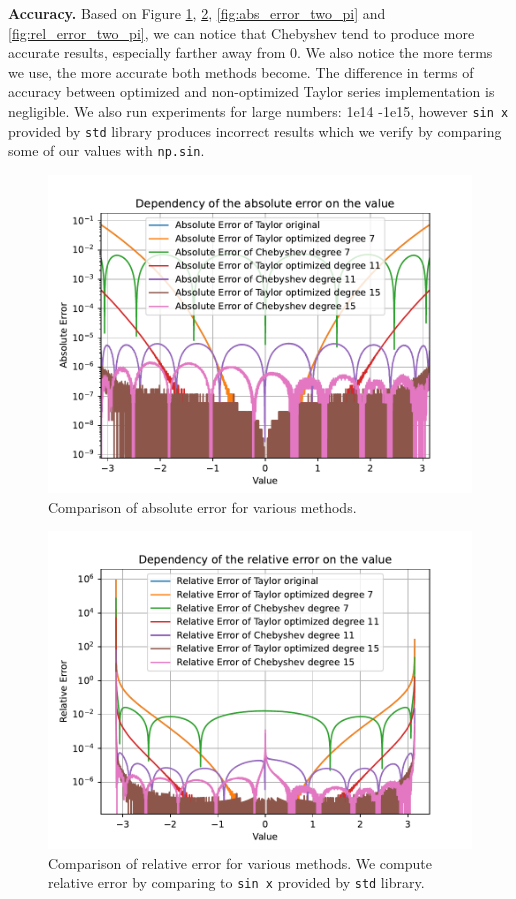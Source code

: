 \documentclass[12pt]{article}
\begin{document}
\textbf{Accuracy.}
Based on Figure \ref{fig:abs_error}, \ref{fig:rel_error}, \ref{fig:abs_error_two_pi} and \ref{fig:rel_error_two_pi}, we can notice that Chebyshev tend to produce more accurate results, especially farther away from 0. We also notice the more terms we use, the more accurate both methods become. The difference in terms of accuracy between optimized and non-optimized Taylor series implementation is negligible.
We also run experiments for large numbers: 1e14 -1e15, however \texttt{sin x} provided by \texttt{std} library produces incorrect results which we verify by comparing some of our values with \texttt{np.sin}.

\begin{figure}[h]
  \centering
  \includegraphics[width=\textwidth]{plots/accuracy/inc_abs_pi_001.pdf}
  \caption{Comparison of absolute error for various methods.}
  \label{fig:abs_error}
\end{figure}

\begin{figure}[h]
  \centering
  \includegraphics[width=\textwidth]{plots/accuracy/inc_rel_pi_001.pdf}
  \caption{Comparison of relative error for various methods. We compute relative error by comparing to \texttt{sin x} provided by \texttt{std} library.}
  \label{fig:rel_error}
\end{figure}
\end{document}
